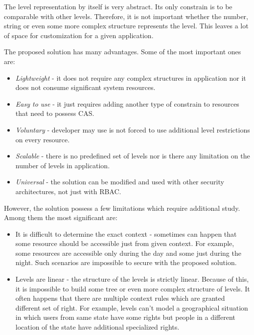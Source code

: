\documentclass{sig-alternate}
\begin{document}
The level representation by itself is very abstract. Its only constrain is to be comparable with other levels. Therefore, it is not important whether the number, string or even some more complex structure represents the level. This leaves a lot of space for customization for a given application.

The proposed solution has many advantages. Some of the most important ones are:

\begin{itemize}  
\setlength{\itemsep}{1pt}
	 \setlength{\parskip}{0pt}
  \setlength{\parsep}{0pt}
  \item {\em Lightweight} - it does not require any complex structures in application nor it does not consume significant system resources. 
  \item {\em Easy to use} - it just requires adding another type of constrain to resources that need to possess CAS.
  
  \item {\em Voluntary} - developer may use is not forced to use additional level restrictions on every resource.
  
  \item {\em Scalable} - there is no predefined set of levels nor is there any limitation on the number of levels in application.
  
  \item {\em Universal} - the solution can be modified and used with other security architectures, not just with RBAC.
\end{itemize}

However, the solution possess a few limitations which require additional study. Among them the most significant are:
\begin{itemize}
		\setlength{\itemsep}{1pt}
	 \setlength{\parskip}{0pt}
  \setlength{\parsep}{0pt}

  \item It is difficult to determine the exact context - sometimes can happen that some resource should be accessible just from given context. For example, some resources are accessible only during the day and some just during the night. Such scenarios are impossible to secure with the proposed solution.
  
  \item Levels are linear - the structure of the levels is strictly linear.  Because of this, it is impossible to build some tree or even more complex structure of levels. It often happens that there are multiple context rules which are granted different set of right. For example, levels can't model a geographical situation in which users from same state have some rights but people in a different location of the state have additional specialized rights.
\end{itemize}
\end{document}
